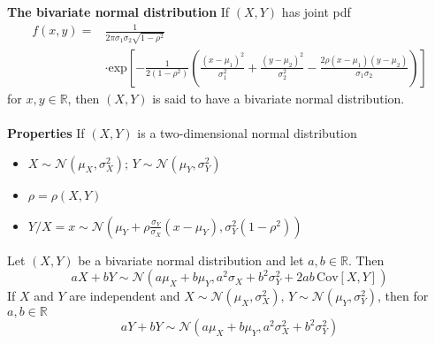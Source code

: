 \documentclass[12pt,a4paper,draft]{report}
\begin{document}
\textbf{The bivariate normal distribution} If $(X,Y)$ has joint pdf
\begin{align*}
f(x,y)=&\frac{1}{2\pi\sigma_1\sigma_2\sqrt{1-\rho^2}}\\
&\cdot\mathrm{exp}\left[-\frac{1}{2(1-\rho^2)}\left(\frac{(x-\mu_1)^2}{\sigma_1^2}+\frac{(y-\mu_2)^2}{\sigma_2^2}-\frac{2\rho(x-\mu_1)(y-\mu_2)}{\sigma_1\sigma_2}\right)\right]
\end{align*}
for $x,y\in\mathbb{R}$, then $(X,Y)$ is said to have a bivariate normal distribution.\\\\
\textbf{Properties} If $(X,Y)$ is a two-dimensional normal distribution
\begin{itemize}
\setlength\itemsep{0em}
\item $X\sim \mathcal{N}(\mu_X,\sigma_X^2);\,Y\sim\mathcal{N}(\mu_Y,\sigma_Y^2)$
\item $\rho=\rho(X,Y)$
\item $Y/X=x\sim\mathcal{N}\left(\mu_Y+\rho\frac{\sigma_Y}{\sigma_X}(x-\mu_Y),\sigma_Y^2(1-\rho^2)\right)$
\end{itemize}
Let $(X,Y)$ be a bivariate normal distribution and let $a,b\in\mathbb{R}$. Then
\begin{equation}
aX+bY\sim\mathcal{N}\left(a\mu_X+b\mu_Y,a^2\sigma_X+b^2\sigma_Y^2+2ab\,\mathrm{Cov}[X,Y]\right)
\end{equation}
If $X$ and $Y$ are independent and $X\sim\mathcal{N}(\mu_X,\sigma_X^2),\,Y\sim\mathcal{N}(\mu_Y,\sigma_Y^2)$, then for $a,b\in\mathbb{R}$
\begin{equation}
aY+bY\sim\mathcal{N}\left(a\mu_X+b\mu_Y,a^2\sigma_X^2+b^2\sigma_Y^2\right)
\end{equation}
\end{document}
